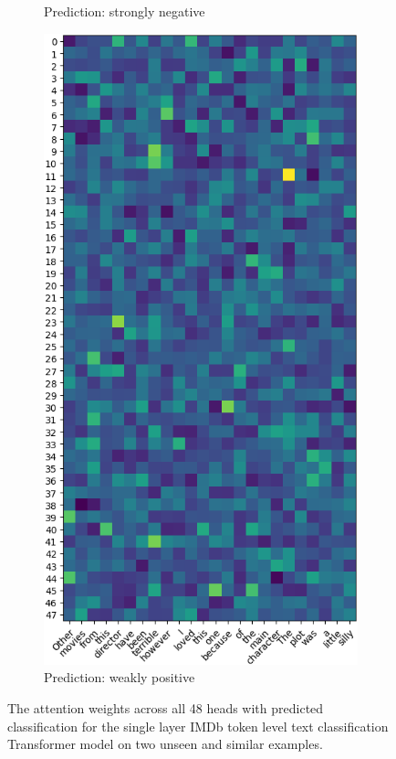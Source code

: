 \begin{figure}[!h]
\begin{subfigure}{.35\textwidth}
        \caption{Prediction: strongly negative}
    \end{subfigure}
    \hspace{.05\textwidth}
    \begin{subfigure}{.55\textwidth}
        \centering
        \includegraphics[height=0.6\textheight]{imgs/example_2.png}
        \caption{Prediction: weakly positive}
    \end{subfigure}
    \caption{The attention weights across all 48 heads with predicted classification for the single layer IMDb token level text classification Transformer model on two unseen and similar examples.}
    \label{fig:wide_attention_full}
\end{figure}

